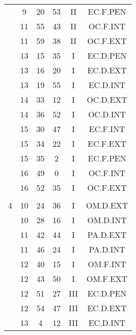 \documentclass[12pt, a4paper]{article}
\begin{document}
\begin{multicols}{3}
{\begin{tabular}{c c c c c c}
	 	 	 	 & 9 & 20 & 53 & II & EC.F.PEN\\%
	 	 	 	 & 11 & 55 & 43 & II & OC.F.INT\\%
	 	 	 	 & 11 & 59 & 38 & II & OC.F.EXT\\%
	 	 	 	 & 13 & 15 & 35 & I & EC.D.PEN\\%
	 	 	 	 & 13 & 16 & 20 & I & EC.D.EXT\\%
	 	 	 	 & 13 & 19 & 55 & I & EC.D.INT\\%
	 	 	 	 & 14 & 33 & 12 & I & OC.D.EXT\\%
	 	 	 	 & 14 & 36 & 52 & I & OC.D.INT\\%
	 	 	 	 & 15 & 30 & 47 & I & EC.F.INT\\%
	 	 	 	 & 15 & 34 & 22 & I & EC.F.EXT\\%
	 	 	 	 & 15 & 35 & 2 & I & EC.F.PEN\\%
	 	 	 	 & 16 & 49 & 0 & I & OC.F.INT\\%
	 	 	 	 & 16 & 52 & 35 & I & OC.F.EXT\\%
	 	 	 	 & & & & & \\%
	 	 	 	4 & 10 & 24 & 36 & I & OM.D.EXT\\%
	 	 	 	 & 10 & 28 & 16 & I & OM.D.INT\\%
	 	 	 	 & 11 & 42 & 44 & I & PA.D.EXT\\%
	 	 	 	 & 11 & 46 & 24 & I & PA.D.INT\\%
	 	 	 	 & 12 & 40 & 15 & I & OM.F.INT\\%
	 	 	 	 & 12 & 43 & 50 & I & OM.F.EXT\\%
	 	 	 	 & 12 & 51 & 27 & III & EC.D.PEN\\%
	 	 	 	 & 12 & 54 & 47 & III & EC.D.EXT\\%
	 	 	 	 & 13 & 4 & 12 & III & EC.D.INT\\%

\end{tabular}}
\end{multicols}
\end{document}
